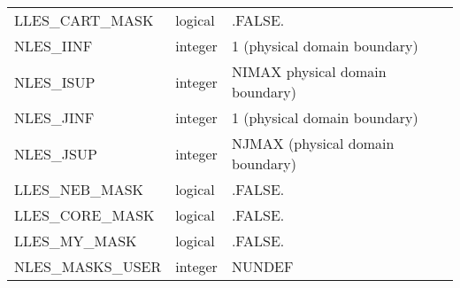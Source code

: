 \begin{center}
\begin{tabular} {|l|l|l|}
LLES\_CART\_MASK              & logical           & .FALSE. \\
NLES\_IINF                    & integer           & 1 (physical domain boundary) \\
NLES\_ISUP                    & integer           & NIMAX physical domain boundary) \\
NLES\_JINF                    & integer           & 1 (physical domain boundary) \\
NLES\_JSUP                    & integer           & NJMAX (physical domain boundary) \\
LLES\_NEB\_MASK               & logical           & .FALSE. \\
LLES\_CORE\_MASK              & logical           & .FALSE. \\
LLES\_MY\_MASK                & logical           & .FALSE. \\
NLES\_MASKS\_USER             & integer           & NUNDEF \\
\hline
\end{tabular}
\end{center}

